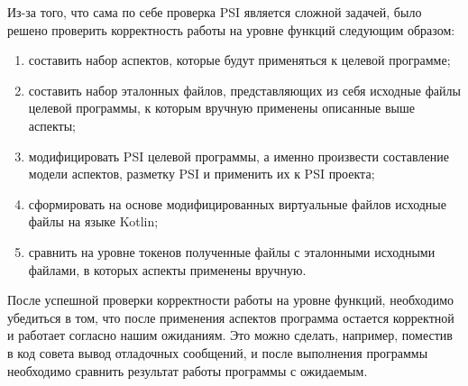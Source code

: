 \documentclass[conference]{IEEEtran}
\begin{document}
Из-за того, что сама по себе проверка PSI является сложной задачей, было решено
проверить корректность работы на уровне функций следующим образом:
\begin{enumerate}
    \item составить набор аспектов, которые будут применяться к целевой
          программе;
    \item составить набор эталонных файлов, представляющих из себя исходные
          файлы целевой программы, к которым вручную применены описанные выше
          аспекты;
	\item модифицировать PSI целевой программы, а именно произвести составление
	      модели аспектов, разметку PSI и применить их к PSI проекта;
	\item сформировать на основе  модифицированных виртуальные файлов исходные
	      файлы на языке Kotlin;
	\item сравнить на уровне токенов полученные файлы с эталонными исходными
	      файлами, в которых аспекты применены вручную.		  
\end{enumerate}



После успешной проверки корректности работы на уровне функций, необходимо
убедиться в том, что после применения аспектов программа остается корректной
и работает согласно нашим ожиданиям.
Это можно сделать, например, поместив в код совета вывод отладочных сообщений,
и после выполнения программы необходимо сравнить результат работы программы с 
ожидаемым.


\end{document}

